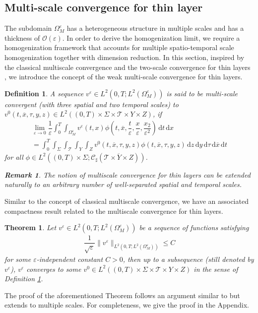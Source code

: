 \documentclass[11pt]{article}
\newtheorem{definition}{Definition}[section]
\newtheorem{theorem}{Theorem}
\newtheorem{remark}{Remark}
\def\es{\varepsilon}
\def\omm{\Omega_M^\varepsilon}
\def\mint{\int_{0}^{T}\int_{\Sigma}\int_{\mathcal{T}}\int_{Y}\int_{Z}}
\def\dzdy{\di{z}\di{y}\di{\tau}\di{\overline{x}}\di{t}}
\def\T{\mathcal{T}}
\newcommand{\di}[1]{\,\mathrm{d}#1}
\begin{document}
\subsection{Multi-scale convergence for thin layer}
	The subdomain $\omm$ has a heterogeneous structure in multiple scales and has a thickness of  $\mathcal{O}(\es)$. In order to derive the homogenization limit, we require a homogenization framework that accounts for multiple spatio-temporal scale homogenization together with dimension reduction. In this section, inspired by the classical multiscale convergence \cite{allaire1996multiscale} and the two-scale convergence for thin layers \cite{maruvsic2000two,neuss2007effective},  we introduce the concept of the weak multi-scale convergence for thin layers.
	\begin{definition}\label{def:multiscale_convergence}
A sequence $v^\es\in L^2(0,T;L^2(\omm))$ is said to be multi-scale convergent (with three spatial and two temporal scales) to $v^0(t,\overline{x},\tau,y,z)\in L^2((0,T)\times \Sigma\times  \T \times Y\times Z)$, if
\begin{multline*}
    \lim_{\es\rightarrow 0}\dfrac{1}{\es}\int_0^T\int_{\omm}v^\es(t,x)\phi\left(t,\overline{x},\dfrac{t}{\es},\dfrac{x}{\es},\dfrac{x_2}{\es^2}\right)\di{t}\di{x}\\
=\mint v^0(t,\overline{x},\tau,y,z)\phi(t,\overline{x},\tau,y,z)\dzdy
\end{multline*}
for all $\phi \in L^2((0,T)\times \Sigma;\mathcal{C}_{\sharp}(\overline{\T\times Y\times Z}))$.
\newline

\begin{remark}
    The notion of multiscale convergence for thin layers can be extended naturally to an arbitrary number of well-separated spatial and temporal scales.
\end{remark}
	\end{definition}
	
	
	
Similar to the concept of classical multiscale convergence, we have an associated compactness result related to the multiscale convergence for thin layers.

	\begin{theorem}\label{theorem:compactness_result}
	Let $v^\es\in L^2(0,T;L^2(\omm))$ be a sequence of functions satisfying
	\begin{align}
	    \dfrac{1}{\sqrt{\es}}\|v^\es\|_{L^2(0,T;L^2(\omm))}\leq C\label{eq:l2bound_on_v_epsilon}
	\end{align}
	for some $\es$-independent constant $C>0$, then up to a subsequence (still denoted by $v^\es$), $v^\es$ converges to some $v^0\in L^2((0,T)\times \Sigma\times \T\times Y\times Z)$ in the sense of Definition \ref{def:multiscale_convergence}.
	\end{theorem}
	The proof of the aforementioned Theorem follows an argument similar to \cite[Proposition 4.2]{neuss2007effective} but extends to multiple scales. For completeness, we give the proof in the Appendix.
\end{document}
